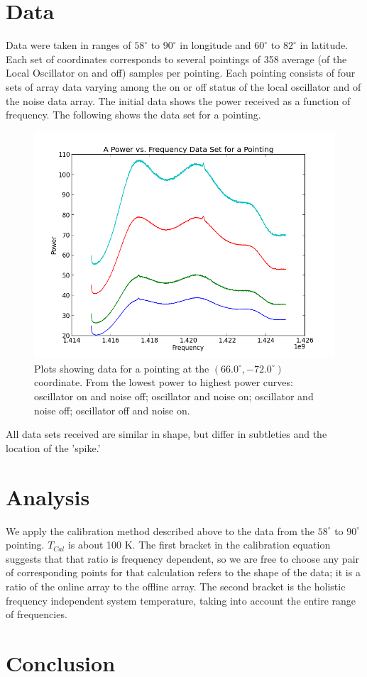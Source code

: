 \documentclass{article}
\begin{document}
\section{Data}
Data were taken in ranges of $58^{\circ}$ to $90^{\circ}$ in longitude and
$60^{\circ}$ to $82^{\circ}$ in latitude. Each set of coordinates
corresponds to several pointings of 358 average (of the Local Oscillator
on and off) samples per pointing. Each pointing consists of four sets of
array data varying among the on or off status of the local oscillator
and of the noise data array. The initial data shows the power received
as a function of frequency. The following shows the data set for a
pointing.
\begin{figure}[h]
\centering
\includegraphics[width=.9\textwidth]{point_data.png}
\caption{Plots showing data for a pointing at the
  $(66.0^{\circ},-72.0^{\circ})$ coordinate. From the lowest power to
  highest power curves: oscillator on and noise off; oscillator and
  noise on; oscillator and noise off; oscillator off and noise on.} 
\end{figure}
All data sets received are similar in shape, but differ in subtleties
and the location of the 'spike.'
\section{Analysis}
We apply the calibration method described above to the data from the
$58^{\circ}$ to $90^{\circ}$ pointing. $T_{Cal}$ is about 100 K. The first
bracket in the calibration equation suggests that that ratio is
frequency dependent, so we are free to choose any pair of corresponding
points for that calculation refers to the shape of the data; it is a
ratio of the online array to the offline array. The second bracket is
the holistic frequency independent system temperature, taking into
account the entire range of frequencies. 
\section{Conclusion}
\end{document}
